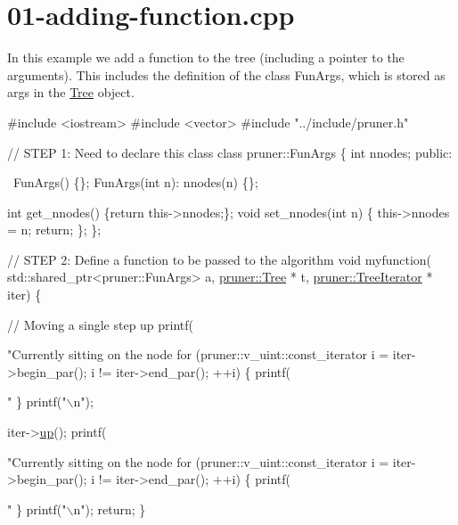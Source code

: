 \hypertarget{01-adding-function_8cpp-example}{}\section{01-\/adding-\/function.\+cpp}
In this example we add a function to the tree (including a pointer to the arguments). This includes the definition of the class Fun\+Args, which is stored as args in the \hyperlink{classTree}{Tree} object.


\begin{DoxyCodeInclude}
\textcolor{preprocessor}{#include <iostream>}
\textcolor{preprocessor}{#include <vector>}
\textcolor{preprocessor}{#include "../include/pruner.h"}

\textcolor{comment}{// STEP 1: Need to declare this class}
\textcolor{keyword}{class }pruner::FunArgs \{
  \textcolor{keywordtype}{int} nnodes;
\textcolor{keyword}{public}:
  
  ~FunArgs() \{\};
  FunArgs(\textcolor{keywordtype}{int} n): nnodes(n) \{\};
  
  \textcolor{keywordtype}{int} get\_nnodes() \{\textcolor{keywordflow}{return} this->nnodes;\};
  \textcolor{keywordtype}{void} set\_nnodes(\textcolor{keywordtype}{int} n) \{
    this->nnodes = n;
    \textcolor{keywordflow}{return};
  \};
\};

\textcolor{comment}{// STEP 2: Define a function to be passed to the algorithm}
\textcolor{keywordtype}{void} myfunction(
    std::shared\_ptr<pruner::FunArgs> a,
    \hyperlink{classpruner_1_1Tree}{pruner::Tree} * t,
    \hyperlink{classpruner_1_1TreeIterator}{pruner::TreeIterator} * iter) \{
  
  \textcolor{comment}{// Moving a single step up}
  printf(\textcolor{stringliteral}{"Currently sitting on the node %
  \textcolor{keywordflow}{for} (pruner::v\_uint::const\_iterator i = iter->begin\_par(); i != iter->end\_par(); ++i) \{
    printf(\textcolor{stringliteral}{" %
  \}
  printf(\textcolor{stringliteral}{"\(\backslash\)n"});
  
  iter->\hyperlink{classpruner_1_1TreeIterator_adca1d999f093a69e2f5d044b358e5da7}{up}();
  printf(\textcolor{stringliteral}{"Currently sitting on the node %
  \textcolor{keywordflow}{for} (pruner::v\_uint::const\_iterator i = iter->begin\_par(); i != iter->end\_par(); ++i) \{
    printf(\textcolor{stringliteral}{" %
  \}
  printf(\textcolor{stringliteral}{"\(\backslash\)n"});
  \textcolor{keywordflow}{return};
\}

}}}}
\end{DoxyCodeInclude}
